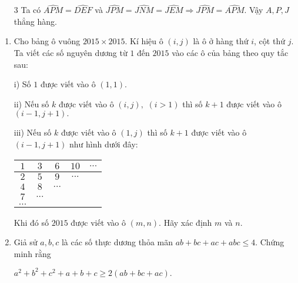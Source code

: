 \begin{ex}
{\begin{enumerate}
$\widehat{APM} = 180^\circ-\widehat{AEM} = \widehat{BED} \Rightarrow \widehat{APM} = \widehat{DEF}.$ Tương tự ta có 

$\widehat{DFE} = \widehat{APN} \Rightarrow \widehat{APN}+\widehat{APM} = \widehat{DFE}+\widehat{FED} = \widehat{MPN}.$
 Mặt khác

$\widehat{MJN} = \widehat{MDN} = \widehat{EDF} \Rightarrow \widehat{MJN}+\widehat{MPN} = 180^\circ \Rightarrow MPNJ$ nội tiếp.
        \item[3]  Ta có $\widehat{APM} = \widehat{DEF}$ và $\widehat{JPM} = \widehat{JNM} = \widehat{JEM} \Rightarrow  \widehat{JPM} = \widehat{APM}. $ Vậy $A,P,J$ thẳng hàng.
    \end{enumerate}
    }
\end{ex}

\begin{ex}%
    \begin{enumerate}
        \item Cho bảng ô vuông $2015 \times 2015$. Kí hiệu ô $(i,j)$ là ô ở hàng thứ $i$, cột thứ $j$. Ta viết các số nguyên dương từ $1$ đến $2015$ vào các ô của bảng theo quy tắc sau:

i) Số $1$ được viết vào ô $(1,1)$.

ii) Nếu số $k$ được viết vào ô $(i,j),$ $(i > 1)$ thì số $k+1$ được viết vào ô $(i-1,j+1).$

iii) Nếu số $k$ được viết vào ô $(1,j)$ thì số $k+1$ được viết vào ô $(i-1,j+1)$ như hình dưới đây:
\begin{center}
\begin{tabular}{| c | c | c | c | c |}
\hline
$1$&$3$&$6$&$10$&$...$\\ 
\hline
$2$&$5$&$9$&$...$&\\ 
\hline
$4$&$8$&$...$& &\\ 
\hline
$7$&$...$ & & & \\ 
\hline
$...$& & & & \\ 
\hline
\end{tabular}
\end{center}

Khi đó số $2015$ được viết vào ô $(m,n).$ Hãy xác định $m$ và $n$.
        \item Giả sử $a,b,c$ là các số thực dương thỏa mãn $ab+bc+ac+abc \le 4.$ Chứng minh rằng
\begin{center}
$a^2+b^2+c^2+a+b+c \ge 2(ab+bc+ac).$
\end{center}


\end{enumerate}
\end{ex}
